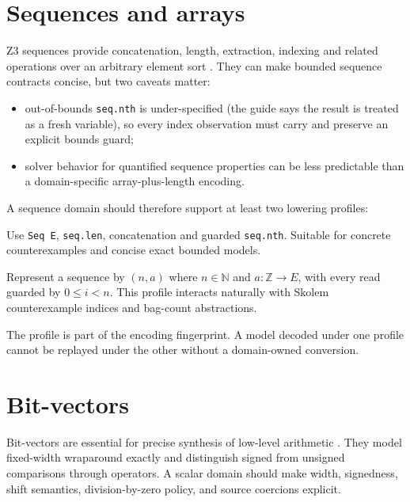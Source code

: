 \documentclass[11pt,oneside]{report}
\newcommand{\Nat}{\mathbb{N}}
\newcommand{\code}[1]{\texttt{#1}}
\begin{document}
\section{Sequences and arrays}

Z3 sequences provide concatenation, length, extraction, indexing and related operations over an arbitrary element sort \cite{z3-sequences}. They can make bounded sequence contracts concise, but two caveats matter:

\begin{itemize}[leftmargin=2em]
\item out-of-bounds \code{seq.nth} is under-specified (the guide says the result is treated as a fresh variable), so every index observation must carry and preserve an explicit bounds guard;
\item solver behavior for quantified sequence properties can be less predictable than a domain-specific array-plus-length encoding.
\end{itemize}

A sequence domain should therefore support at least two lowering profiles:

\begin{description}[leftmargin=2.2em,style=nextline]
\item[Native sequence profile.] Use \code{Seq E}, \code{seq.len}, concatenation and guarded \code{seq.nth}. Suitable for concrete counterexamples and concise exact bounded models.
\item[Array-plus-length profile.] Represent a sequence by $(n,a)$ where $n\in\Nat$ and $a:\mathbb{Z}\to E$, with every read guarded by $0\le i<n$. This profile interacts naturally with Skolem counterexample indices and bag-count abstractions.
\end{description}

The profile is part of the encoding fingerprint. A model decoded under one profile cannot be replayed under the other without a domain-owned conversion.

\section{Bit-vectors}

Bit-vectors are essential for precise synthesis of low-level arithmetic \cite{z3-bitvectors}. They model fixed-width wraparound exactly and distinguish signed from unsigned comparisons through operators. A scalar domain should make width, signedness, shift semantics, division-by-zero policy, and source coercions explicit.
\end{document}
